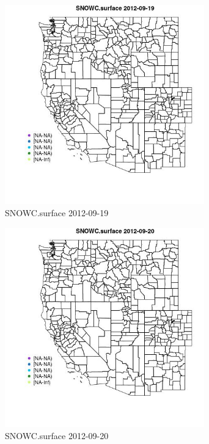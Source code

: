 \begin{figure} 
\centering  
\includegraphics[width=0.77\textwidth]{Code_Outputs/ML_input_report_ML_input_PM25_Step5_part_d_de_duplicated_aves_ML_input_MapObsSNOWCsurface2012-09-19.jpg} 
\caption{\label{fig:ML_input_report_ML_input_PM25_Step5_part_d_de_duplicated_aves_ML_inputMapObsSNOWCsurface2012-09-19}SNOWC.surface 2012-09-19} 
\end{figure} 
 

\begin{figure} 
\centering  
\includegraphics[width=0.77\textwidth]{Code_Outputs/ML_input_report_ML_input_PM25_Step5_part_d_de_duplicated_aves_ML_input_MapObsSNOWCsurface2012-09-20.jpg} 
\caption{\label{fig:ML_input_report_ML_input_PM25_Step5_part_d_de_duplicated_aves_ML_inputMapObsSNOWCsurface2012-09-20}SNOWC.surface 2012-09-20} 
\end{figure} 
 

